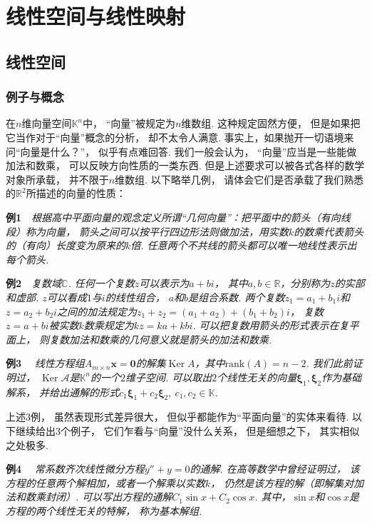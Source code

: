 \clearpage

\section{线性空间与线性映射}

\subsection{线性空间}

\subsubsection{例子与概念}

在$n$维向量空间$\mathbb{K}^n$中，
“向量”被规定为$n$维数组.
这种规定固然方便，
但是如果把它当作对于“向量”概念的分析，
却不太令人满意.
事实上，如果抛开一切语境来问“向量是什么？”，
似乎有点难回答.
我们一般会认为，
“向量”应当是一些能做加法和数乘，
可以反映方向性质的一类东西.
但是上述要求可以被各式各样的数学对象所承载，
并不限于$n$维数组.
以下略举几例，
请体会它们是否承载了我们熟悉的$\mathbb{R}^2$所描述的向量的性质：\medskip

\textbf{例1}~~\textit{根据高中平面向量的观念定义所谓“几何向量”：把平面中的箭头（有向线段）称为向量，
箭头之间可以按平行四边形法则做加法，用实数$k$的数乘代表箭头的（有向）长度变为原来的$k$倍.
任意两个不共线的箭头都可以唯一地线性表示出每个箭头.}\medskip

\textbf{例2}~~\textit{复数域$\mathbb{C}$. 任何一个复数$z$可以表示为$a + bi$，
其中$a,b \in \mathbb{R}$，分别称为$z$的实部和虚部.
$z$可以看成$1$与$i$的线性组合，
$a$和$b$是组合系数.
两个复数$z_1 = a_1 + b_1 i$和$z = a_2 + b_2 i$之间的加法规定为$z_1 + z_2 = (a_1 + a_2) + (b_1 + b_2)i $，
复数$z = a+ bi$被实数$k$数乘规定为$kz = ka + kbi$.
可以把复数用箭头的形式表示在复平面上，
则复数加法和数乘的几何意义就是箭头的加法和数乘.}\medskip

\textbf{例3}~~
\textit{线性方程组$A_{m \times n} \bm{x} = \bm{0}$的解集$\operatorname{Ker} A$，其中$\mathrm{rank}(A)=n-2$.
我们此前证明过，
$\operatorname{Ker}\mathcal{A}$是$\mathbb{K}^n$的一个$2$维子空间.
可以取出$2$个线性无关的向量$\bm{\xi}_1,\bm{\xi}_2$作为基础解系，
并给出通解的形式$c_1 \bm{\xi}_1 + c_2 \bm{\xi}_2,~ c_1 ,c_2 \in \mathbb{K}$.
}\medskip

上述$3$例，
虽然表现形式差异很大，
但似乎都能作为“平面向量”的实体来看待.
以下继续给出$3$个例子，
它们乍看与“向量”没什么关系，
但是细想之下，
其实相似之处极多.\medskip

\textbf{例4}~~
\textit{常系数齐次线性微分方程$y'' + y = 0$的通解.
在高等数学中曾经证明过，
该方程的任意两个解相加，或者一个解乘以实数$k$，
仍然是该方程的解（即解集对加法和数乘封闭）.
可以写出方程的通解$C_1 \sin x + C_2 \cos x$.
其中，$\sin x $和$\cos x$是方程的两个线性无关的特解，
称为基本解组.
}\medskip

